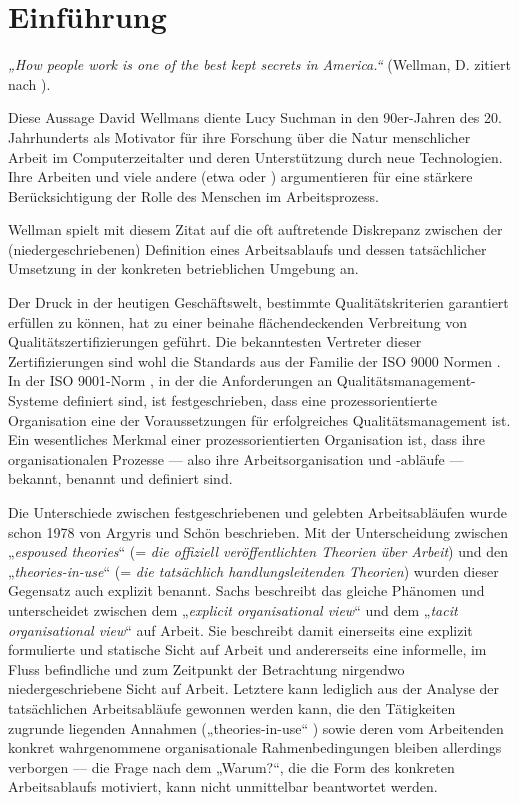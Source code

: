 \chapter{Einführung} %
\label{cha:einführung}

\emph{„How people work is one of the best kept secrets in America.“} (Wellman, D. zitiert nach \citep{Suchman95}).

Diese Aussage David Wellmans diente Lucy Suchman in den 90er-Jahren des 20. Jahrhunderts als Motivator für ihre Forschung über die Natur menschlicher Arbeit im Computerzeitalter und deren Unterstützung durch neue Technologien. Ihre Arbeiten und viele andere (etwa \citep{Schmidt92} oder \citep{Sachs95}) argumentieren für eine stärkere Berücksichtigung der Rolle des Menschen im Arbeitsprozess.

Wellman spielt mit diesem Zitat auf die oft auftretende Diskrepanz zwischen der (niedergeschriebenen) Definition eines Arbeitsablaufs und dessen tatsächlicher Umsetzung in der konkreten betrieblichen Umgebung an.

Der Druck in der heutigen Geschäftswelt, bestimmte Qualitätskriterien garantiert erfüllen zu können, hat zu einer beinahe flächendeckenden Verbreitung von Qualitätszertifizierungen geführt. Die bekanntesten Vertreter dieser Zertifizierungen sind wohl die Standards aus der Familie der ISO 9000 Normen \citep{ISO05}. In der ISO 9001-Norm \citep{ISO00}, in der die Anforderungen an Qualitätsmanagement-Systeme definiert sind, ist festgeschrieben, dass eine prozessorientierte Organisation eine der Voraussetzungen für erfolgreiches Qualitätsmanagement ist. Ein wesentliches Merkmal einer prozessorientierten Organisation ist, dass ihre organisationalen Prozesse — also ihre Arbeitsorganisation und -abläufe — bekannt, benannt und definiert sind. 

Die Unterschiede zwischen festgeschriebenen und gelebten Arbeitsabläufen wurde schon 1978 von Argyris und Schön \citep{Argyris78} beschrieben. Mit der Unterscheidung zwischen „\emph{espoused theories}“ (= \emph{die offiziell veröffentlichten Theorien über Arbeit}) und den „\emph{theories-in-use}“ (= \emph{die tatsächlich handlungsleitenden Theorien}) wurden dieser Gegensatz auch explizit benannt. Sachs \citep{Sachs95} beschreibt das gleiche Phänomen und unterscheidet zwischen dem „\emph{explicit organisational view}“ und dem „\emph{tacit organisational view}“ auf Arbeit. Sie beschreibt damit einerseits eine explizit formulierte und statische Sicht auf Arbeit und andererseits eine informelle, im Fluss befindliche und zum Zeitpunkt der Betrachtung nirgendwo niedergeschriebene Sicht auf Arbeit. Letztere kann lediglich aus der Analyse der tatsächlichen Arbeitsabläufe gewonnen werden kann, die den Tätigkeiten zugrunde liegenden Annahmen („theories-in-use“ \citep{Argyris78}) sowie deren vom Arbeitenden konkret wahrgenommene organisationale Rahmenbedingungen bleiben allerdings verborgen — die Frage nach dem „Warum?“, die die Form des konkreten Arbeitsablaufs motiviert, kann nicht unmittelbar beantwortet werden.

